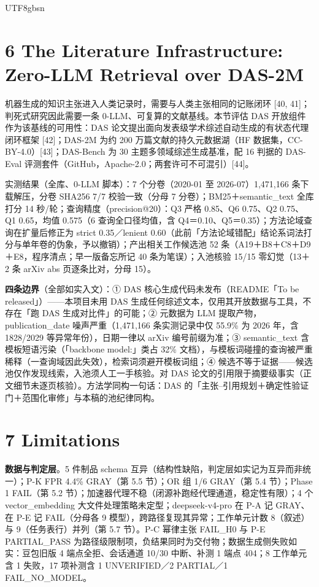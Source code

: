 \documentclass[10pt,a4paper]{article}
\begin{document}
\begin{CJK}{UTF8}{gbsn}
\section*{6 The Literature Infrastructure: Zero-LLM Retrieval over DAS-2M}机器生成的知识主张进入人类记录时，需要与人类主张相同的记账闭环 [40, 41]；判死式研究因此需要一条 0-LLM、可复算的文献基线。本节评估 DAS 开放组件作为该基线的可用性：DAS 论文提出面向发表级学术综述自动生成的有状态代理闭环框架 [42]；DAS-2M 为约 200 万篇文献的持久元数据湖（HF 数据集，CC-BY-4.0）[43]；DAS-Bench 为 30 主题多领域综述生成基准，配 16 判据的 DAS-Eval 评测套件（GitHub，Apache-2.0；两套许可不可混引）[44]。

实测结果（全库、0-LLM 脚本）：7 个分卷（2020-01 至 2026-07）1,471,166 条下载解压，分卷 SHA256 7/7 校验一致（分母 7 分卷）；BM25＋semantic\_text 全库打分 14 秒/轮；查询精度（precision@20）：Q3 严格 0.85、Q6 0.75、Q2 0.75、Q1 0.65，均值 0.575（6 查询全口径均值，含 Q4＝0.10、Q5＝0.35）；方法论域查询在扩量后修正为 strict 0.35／lenient 0.60（此前「方法论域错配」结论系词法打分与单年卷的伪象，予以撤销）；产出相关工作候选池 52 条（A19＋B8＋C8＋D9＋E8，程序清点；早一版备忘所记 40 条为笔误）；入池核验 15/15 零幻觉（13＋2 条 arXiv abs 页逐条比对，分母 15）。

\textbf{四条边界}（全部如实入文）：① DAS 核心生成代码未发布（README「To be released」）——本项目未用 DAS 生成任何综述文本，仅用其开放数据与工具，不存在「跑 DAS 生成对比件」的可能；② 元数据为 LLM 提取产物，publication\_date 噪声严重（1,471,166 条实测记录中仅 55.9\% 为 2026 年，含 1828/2029 等异常年份），日期一律以 arXiv 编号前缀为准；③ semantic\_text 含模板短语污染（「backbone model:」类占 32\% 文档），与模板词碰撞的查询被严重稀释（一查询域因此失效），检索词须避开模板词组；④ 候选不等于证据——候选池仅作发现线索，入池须人工一手核验。对 DAS 论文的引用限于摘要级事实（正文细节未逐页核验）。方法学同构一句话：DAS 的「主张–引用规划＋确定性验证门＋范围化审修」与本稿的池纪律同构。


\section*{7 Limitations}\textbf{数据与判定层}。5 件制品 schema 互异（结构性缺陷，判定层如实记为互异而非统一）；P-K FPR 4.4\% GRAY（第 5.5 节）；OR 组 1/6 GRAY（第 5.4 节）；Phase 1 FAIL（第 5.2 节）；加速器代理不稳（闭源补跑经代理通道，稳定性有限）；4 个 vector\_embedding 大文件处理策略未定型；deepseek-v4-pro 在 P-A 记 GRAY、在 P-E 记 FAIL（分母各 9 模型），跨路径复现其异常；工作单元计数 8（叙述）与 9（任务表行）并列（第 5.7 节）。P-C 幂律主张 FAIL\_H0 与 P-E PARTIAL\_PASS 为路径级限制项，负结果同时为交付物；数据生成侧失败如实：豆包旧版 4 端点全拒、会话通道 10/30 中断、补测 1 端点 404；8 工作单元含 1 失败，17 项补测含 1 UNVERIFIED／2 PARTIAL／1 FAIL\_NO\_MODEL。


\end{CJK}
\end{document}
